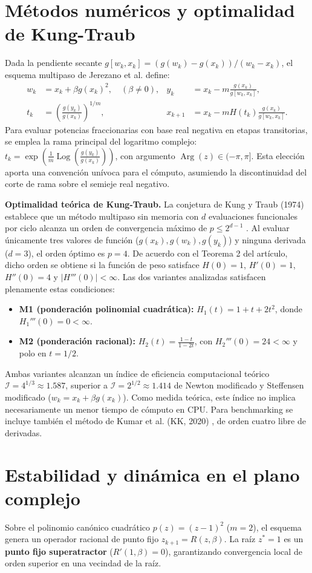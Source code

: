 \documentclass[10pt,a4paper]{article}
\begin{document}
\section{Métodos numéricos y optimalidad de Kung-Traub}
Dada la pendiente secante $g[w_k,x_k]=(g(w_k)-g(x_k))/(w_k-x_k)$, el esquema multipaso de Jerezano et al. define:
\begin{align*}
w_k&=x_k+\beta g(x_k)^2,\quad (\beta\neq 0), & y_k&=x_k-m\frac{g(x_k)}{g[w_k,x_k]},\\
t_k&=\left(\frac{g(y_k)}{g(x_k)}\right)^{1/m}, & x_{k+1}&=x_k-mH(t_k)\frac{g(x_k)}{g[w_k,x_k]}.
\end{align*}
Para evaluar potencias fraccionarias con base real negativa en etapas transitorias, se emplea la rama principal del logaritmo complejo: $t_k=\exp\left(\frac{1}{m}\operatorname{Log}\left(\frac{g(y_k)}{g(x_k)}\right)\right)$, con argumento $\operatorname{Arg}(z)\in(-\pi,\pi]$. Esta elección aporta una convención unívoca para el cómputo, asumiendo la discontinuidad del corte de rama sobre el semieje real negativo.

\textbf{Optimalidad teórica de Kung-Traub.} La conjetura de Kung y Traub (1974) establece que un método multipaso sin memoria con $d$ evaluaciones funcionales por ciclo alcanza un orden de convergencia máximo de $p\le 2^{d-1}$ \cite{kungtraub}. Al evaluar únicamente tres valores de función ($g(x_k), g(w_k), g(y_k)$) y ninguna derivada ($d=3$), el orden óptimo es $p=4$. De acuerdo con el Teorema 2 del artículo, dicho orden se obtiene si la función de peso satisface $H(0)=1$, $H'(0)=1$, $H''(0)=4$ y $|H'''(0)|<\infty$. Las dos variantes analizadas satisfacen plenamente estas condiciones:
\begin{itemize}
\item \textbf{M1 (ponderación polinomial cuadrática):} $H_1(t)=1+t+2t^2$, donde $H_1'''(0)=0<\infty$.
\item \textbf{M2 (ponderación racional):} $H_2(t)=\frac{1-t}{1-2t}$, con $H_2'''(0)=24<\infty$ y polo en $t=1/2$.
\end{itemize}
Ambas variantes alcanzan un índice de eficiencia computacional teórico $\mathcal{I}=4^{1/3}\approx 1.587$, superior a $\mathcal{I}=2^{1/2}\approx 1.414$ de Newton modificado y Steffensen modificado ($w_k=x_k+\beta g(x_k)$). Como medida teórica, este índice no implica necesariamente un menor tiempo de cómputo en CPU. Para benchmarking se incluye también el método de Kumar et al. (KK, 2020) \cite{kk}, de orden cuatro libre de derivadas.

\section{Estabilidad y dinámica en el plano complejo}
Sobre el polinomio canónico cuadrático $p(z)=(z-1)^2$ ($m=2$), el esquema genera un operador racional de punto fijo $z_{k+1}=R(z,\beta)$. La raíz $z^*=1$ es un \textbf{punto fijo superatractor} ($R'(1,\beta)=0$), garantizando convergencia local de orden superior en una vecindad de la raíz.
\end{document}
